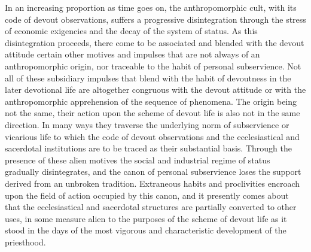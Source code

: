 \documentclass[12pt]{report}
\begin{document}
In an increasing proportion as time goes on, the anthropomorphic
cult, with its code of devout observations, suffers a progressive
disintegration through the stress of economic exigencies and the decay
of the system of status. As this disintegration proceeds, there come to
be associated and blended with the devout attitude certain other motives
and impulses that are not always of an anthropomorphic origin, nor
traceable to the habit of personal subservience. Not all of these
subsidiary impulses that blend with the habit of devoutness in the later
devotional life are altogether congruous with the devout attitude or
with the anthropomorphic apprehension of the sequence of phenomena. The
origin being not the same, their action upon the scheme of devout
life is also not in the same direction. In many ways they traverse the
underlying norm of subservience or vicarious life to which the code of
devout observations and the ecclesiastical and sacerdotal institutions
are to be traced as their substantial basis. Through the presence of
these alien motives the social and industrial regime of status gradually
disintegrates, and the canon of personal subservience loses the support
derived from an unbroken tradition. Extraneous habits and proclivities
encroach upon the field of action occupied by this canon, and it
presently comes about that the ecclesiastical and sacerdotal structures
are partially converted to other uses, in some measure alien to the
purposes of the scheme of devout life as it stood in the days of the
most vigorous and characteristic development of the priesthood.
\end{document}
